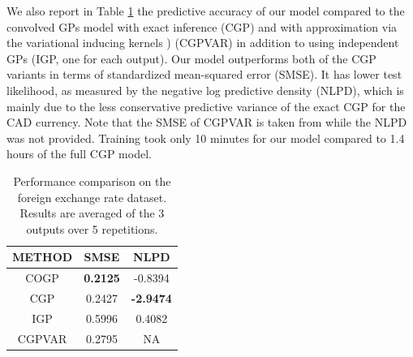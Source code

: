 We also report in Table \ref{tab:fx} the predictive accuracy of our model compared to the convolved GPs model with exact inference \citet{alvarez-lawrence-nips-08} (CGP) and with approximation via the variational inducing kernels \citet{alvarez2010efficient}) (CGPVAR) in addition to using independent GPs (IGP, one for each output).
Our model outperforms both of the CGP variants in terms of standardized mean-squared error (SMSE).
It has lower test likelihood, as measured by the negative log predictive density (NLPD), which is mainly due to the less conservative predictive variance of the exact CGP for the CAD currency.
Note that the SMSE of CGPVAR is taken from \citet{alvarez2010efficient} while the NLPD was not provided.
Training took only 10 minutes for our model compared to 1.4 hours of the full CGP model.

\setlength{\tabcolsep}{4pt}
\begin{table}[t]
\caption{Performance comparison on the foreign exchange rate dataset. Results are averaged of the 3 outputs over 5 repetitions.}
\label{tab:fx}
\begin{center}
\begin{tabular}{ccc}
\toprule
\textbf{METHOD} & \textbf{SMSE} & \textbf{NLPD} \\ \hline
COGP  & \textbf{0.2125} & -0.8394 \\
CGP & 0.2427 & \textbf{-2.9474} \\
IGP & 0.5996 & 0.4082 \\
CGPVAR & 0.2795 & NA \\
\bottomrule
\end{tabular}
\end{center}
\end{table}

